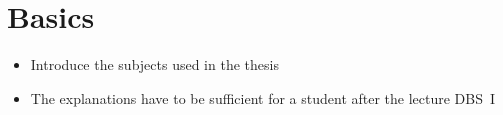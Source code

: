 \chapter{Basics}
\begin{itemize}
  \item Introduce the subjects used in the thesis
  \item The explanations have to be sufficient for a student after the lecture DBS~I
\end{itemize}


